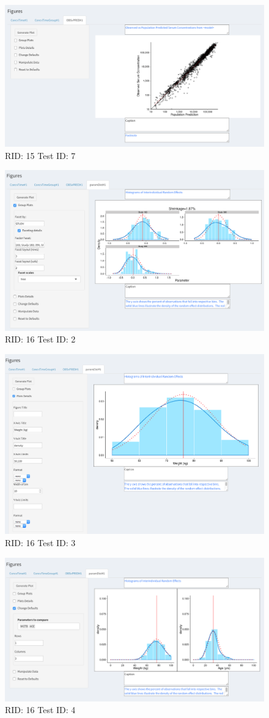 \begin{figure}[H]
\includegraphics[width=.8\textwidth]{screencaps/15-7-1.png}
\caption{RID: 15 Test ID: 7}
\end{figure}
\begin{figure}[H]
\includegraphics[width=.8\textwidth]{screencaps/16-2-1.png}
\caption{RID: 16 Test ID: 2}
\end{figure}
\begin{figure}[H]
\includegraphics[width=.8\textwidth]{screencaps/16-3-1.png}
\caption{RID: 16 Test ID: 3}
\end{figure}
\begin{figure}[H]
\includegraphics[width=.8\textwidth]{screencaps/16-4-1.png}
\caption{RID: 16 Test ID: 4}
\end{figure}
